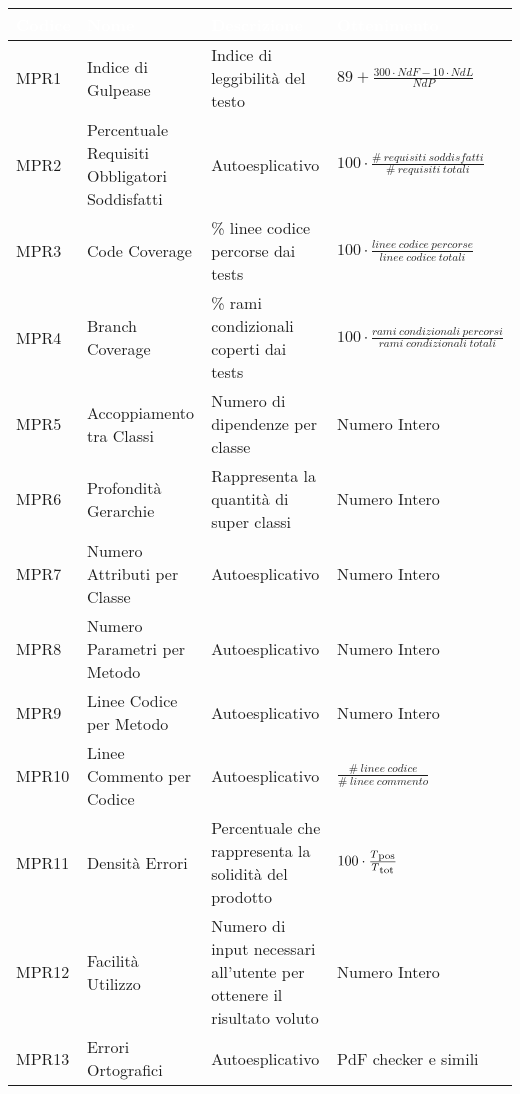 {
    
    \setlength{\freewidth}{\dimexpr\textwidth-10\tabcolsep}
    \renewcommand{\arraystretch}{1.5}
    \centering
    \setlength{\aboverulesep}{0pt}
    \setlength{\belowrulesep}{0pt}
    \begin{longtable}{C{.115\freewidth} C{.257\freewidth} C{.26\freewidth} C{.4\freewidth}}
       \toprule
    \textcolor{white}{\textbf{Codice}}&
    \textcolor{white}{\textbf{Nome}}&
    \textcolor{white}{\textbf{Descrizione}}&
    \textcolor{white}{\textbf{Ottenimento}}\\	
    \toprule
    \endhead

    
    MPR1 & Indice di Gulpease & Indice di leggibilità del testo & $89+\frac{300\cdot NdF-10\cdot NdL}{NdP}$  \\
    MPR2 & Percentuale Requisiti Obbligatori Soddisfatti & Autoesplicativo & $100\cdot \frac{\# \: requisiti \: soddisfatti}{\# \: requisiti \: totali}$ \\
    MPR3 & Code Coverage & \% linee codice percorse dai tests & $100\cdot \frac{linee \: codice \: percorse}{linee \: codice \: totali}$ \\
    MPR4 & Branch Coverage & \% rami condizionali coperti dai tests  & $100\cdot \frac{rami \: condizionali \: percorsi}{rami \: condizionali \: totali}$ \\
    MPR5 & Accoppiamento tra Classi & Numero di dipendenze per classe & Numero Intero \\
    MPR6 & Profondità Gerarchie & Rappresenta la quantità di super classi & Numero Intero \\
    MPR7 & Numero Attributi per Classe & Autoesplicativo & Numero Intero \\
    MPR8 & Numero Parametri per Metodo & Autoesplicativo & Numero Intero \\
    MPR9 & Linee Codice per Metodo & Autoesplicativo & Numero Intero \\
    MPR10 & Linee Commento per Codice & Autoesplicativo & $\frac{\# \: linee \: codice}{\# \: linee \: commento}$ \\
    MPR11 & Densità Errori & Percentuale che rappresenta la solidità del prodotto & $100\cdot \frac{T\textsubscript{pos}}{T\textsubscript{tot}}$ \\
    MPR12 & Facilità Utilizzo  & Numero di input necessari all'utente per ottenere il risultato voluto & Numero Intero \\
    MPR13 & Errori Ortografici & Autoesplicativo & PdF checker e simili \\

\end{longtable}}

